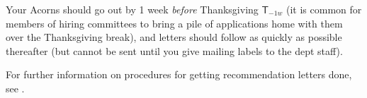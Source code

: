 \documentclass{econtex}
\begin{document}
\begin{enumerate}
\begin{comment}   %
Many schools are now accepting letters by email rather than snail
mail.  Nonetheless, often email addresses do not work.  Therefore the
procedure is as follows.  First, compile a list of employers accepting
letters by email, with the appropriate email addresses.  Separately,
you must supply an envelope with the appropriate address on it (these
can be generated using the \texttt{EmployersMoniker.xls} spreadsheet
which you should customize to, e.g.,
\texttt{EmployersArbatliEC.xls}; but please do NOT customize the columns of 
the \texttt{EmployersMoniker.xls} spreadsheet -- this will make it more difficult
for you in generating your letters as well as for the JMPO when trying to figure
out who has applied where).  You must give a printed copy of
your spreadsheet to the office staff, because they will use these
physical paper copies to keep track of their progress in sending out
the letters.  The office will try sending the letters by email.  If
that fails (wrong email addresses are VERY common), the office will
send letters by snail mail.  {\it The department will cover postage on
  any such letters.}  Finally, provide a separate set of envelopes for
the employers who only accept letters by mail.  Your adviser may also
want you to separate potential employers into academic and
non-academic categories; if so, provide separate sets of envelopes for
these categories.
\end{comment}
  
  Your Acorns should go out by 1 week {\it before} Thanksgiving $\mathsf{T}_{-1w}$ (it is
  common for members of hiring committees to bring a pile of applications
  home with them over the Thanksgiving break), and letters should
  follow as quickly as possible thereafter (but cannot be sent until
  you give mailing labels to the dept staff).  

For further information on procedures for getting recommendation letters done, see \recLet.

\begin{comment} %
\item In October and November, a few major employers (IMF, the Fed)
  may schedule preliminary interviews on campus with Hopkins
  students.\footnote{In recent years, these employers seem to have
    reduced or eliminated their campus visits - not just to Hopkins, but in general.
    Don't be disturbed if no Hopkins visit is scheduled.}  Note that
  the IMF tends to like to draw up their list of interviewees themselves
a week or two before they come to campus, which can be problematic
because sometimes they want to do the interviews before the deadline
for deciding whether you are on the market.  This is one of the many
annoying things about the IMF's job application process, because you
may need to make a judgment about applying to the IMF earlier than a
general judgment about whether to be on the market.  However, if you
change your mind after the interview you can withdraw your application
(at some unknown expected cost to your chances for reapplying next
year).
\end{comment} 


\end{enumerate}
\end{document}
